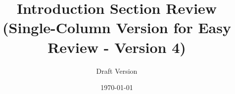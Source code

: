 \documentclass[12pt,a4paper]{article}
\begin{document}
\title{Introduction Section Review\\
\large (Single-Column Version for Easy Review - Version 4)}
\author{Draft Version}
\date{\today}
\maketitle



\end{document}
